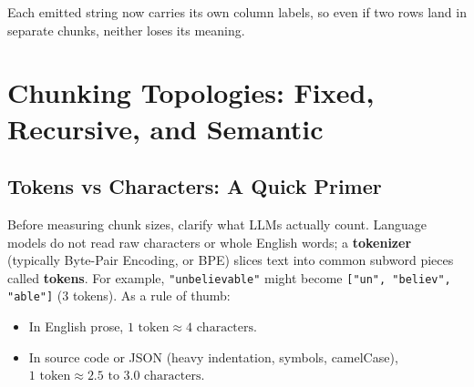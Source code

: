 Each emitted string now carries its own column labels, so even if two rows land in separate chunks, neither loses its meaning.

\section{Chunking Topologies: Fixed, Recursive, and Semantic}

\subsection{Tokens vs Characters: A Quick Primer}
Before measuring chunk sizes, clarify what LLMs actually count. Language models do not read raw characters or whole English words; a \textbf{tokenizer} (typically Byte-Pair Encoding, or BPE) slices text into common subword pieces called \textbf{tokens}. For example, \texttt{"unbelievable"} might become \texttt{["un", "believ", "able"]} (3 tokens). As a rule of thumb:
\begin{itemize}[leftmargin=18pt]
  \item In English prose, $1\text{ token} \approx 4\text{ characters}$.
  \item In source code or JSON (heavy indentation, symbols, camelCase), $1\text{ token} \approx 2.5\text{ to }3.0\text{ characters}$.
\end{itemize}

